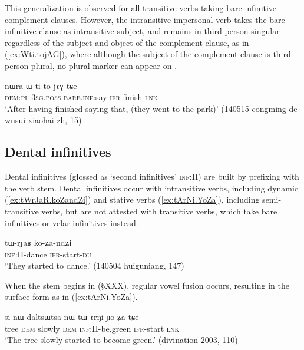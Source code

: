 This generalization is observed for all transitive verbs taking bare infinitive complement clauses. However, the intransitive impersonal verb  takes the bare infinitive clause as intransitive subject, and remains in third person singular regardless of the subject and object of the complement clause, as in (\ref{ex:Wti.tojAG}), where although the subject of the complement clause is third person plural, no plural marker can appear on .

\begin{exe}
\ex \label{ex:Wti.tojAG}
\gll nɯra ɯ-ti to-jɤɣ tɕe \\
\textsc{dem:pl} \textsc{3sg.poss-bare.inf}:say \textsc{ifr}-finish \textsc{lnk}\\
\glt `After having finished saying that, (they went to the park)' (140515 congming de wusui xiaohai-zh, 15)
\end{exe}


\subsection{Dental infinitives} \label{sec:dental.inf}
Dental infinitives (glossed as `second infinitives' \textsc{inf}:II) are built by prefixing  with the verb stem. Dental infinitives occur with intransitive verbs, including dynamic (\ref{ex:tWrJaR.koZandZi}) and stative verbs (\ref{ex:tArNi.YoZa}), including semi-transitive verbs, but are not attested with transitive verbs, which take bare infinitives or velar infinitives instead.

\begin{exe} 
\ex \label{ex:tWrJaR.koZandZi}
\gll tɯ-rɟaʁ ko-ʑa-ndʑi \\
\textsc{inf:II}-dance \textsc{ifr}-start-\textsc{du} \\
\glt `They started to dance.' (140504 huiguniang, 147)
\end{exe} 

When the stem begins in  (§XXX), regular vowel fusion occurs, resulting in the surface form  as in (\ref{ex:tArNi.YoZa}).

\begin{exe} 
\ex \label{ex:tArNi.YoZa}
\gll si nɯ daltsɯtsa nɯ tɯ-ɤrŋi ɲo-ʑa tɕe \\
tree \textsc{dem} slowly \textsc{dem} \textsc{inf}:II-be.green \textsc{ifr}-start \textsc{lnk} \\
\glt `The tree slowly started to become green.' (divination 2003, 110)
\end{exe} 


